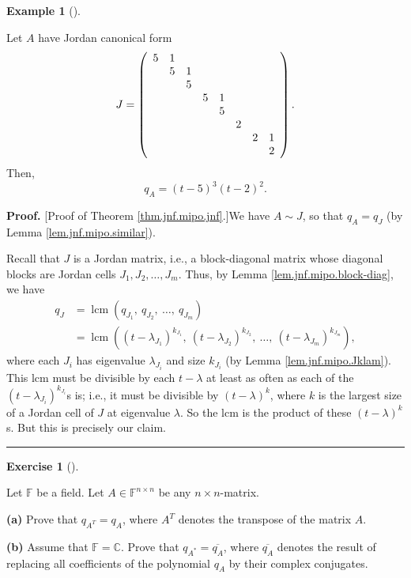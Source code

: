 \documentclass[numbers=enddot,12pt,final,onecolumn,notitlepage]{scrartcl}%
\newcounter{exer}
\numberwithin{exer}{subsection}
\theoremstyle{definition}
\newtheorem{exam}[theo]{Example}
\newenvironment{example}[1][]
{\begin{exam}[#1]\begin{leftbar}}
{\end{leftbar}\end{exam}}
\newtheorem{exmp}[exer]{Exercise}
\newenvironment{exercise}[1][]
{\begin{exmp}[#1]\begin{leftbar}}
{\end{leftbar}\end{exmp}}
\newenvironment{proof}[1][Proof]{\noindent\textbf{#1.} }{\ \rule{0.5em}{0.5em}}
\begin{document}
\begin{example}
Let $A$ have Jordan canonical form%
\[
J=\left(
\begin{array}
[c]{cccccccc}%
5 & 1 &  &  &  &  &  & \\
& 5 & 1 &  &  &  &  & \\
&  & 5 &  &  &  &  & \\
&  &  & 5 & 1 &  &  & \\
&  &  &  & 5 &  &  & \\
&  &  &  &  & 2 &  & \\
&  &  &  &  &  & 2 & 1\\
&  &  &  &  &  &  & 2
\end{array}
\right)  .
\]
Then,%
\[
q_{A}=\left(  t-5\right)  ^{3}\left(  t-2\right)  ^{2}.
\]

\end{example}

\begin{proof}
[Proof of Theorem \ref{thm.jnf.mipo.jnf}.]We have $A\sim J$, so that
$q_{A}=q_{J}$ (by Lemma \ref{lem.jnf.mipo.similar}).

Recall that $J$ is a Jordan matrix, i.e., a block-diagonal matrix whose
diagonal blocks are Jordan cells $J_{1},J_{2},\ldots,J_{m}$. Thus, by Lemma
\ref{lem.jnf.mipo.block-diag}, we have%
\begin{align*}
q_{J}  &  =\operatorname{lcm}\left(  q_{J_{1}},\ q_{J_{2}},\ \ldots
,\ q_{J_{m}}\right) \\
&  =\operatorname{lcm}\left(  \left(  t-\lambda_{J_{1}}\right)  ^{k_{J_{1}}%
},\ \left(  t-\lambda_{J_{2}}\right)  ^{k_{J_{2}}},\ \ldots,\ \left(
t-\lambda_{J_{m}}\right)  ^{k_{J_{m}}}\right)  ,
\end{align*}
where each $J_{i}$ has eigenvalue $\lambda_{J_{i}}$ and size $k_{J_{i}}$ (by
Lemma \ref{lem.jnf.mipo.Jklam}). This lcm must be divisible by each
$t-\lambda$ at least as often as each of the $\left(  t-\lambda_{J_{i}%
}\right)  ^{k_{J_{i}}}$s is; i.e., it must be divisible by $\left(
t-\lambda\right)  ^{k}$, where $k$ is the largest size of a Jordan cell of $J$
at eigenvalue $\lambda$. So the lcm is the product of these $\left(
t-\lambda\right)  ^{k}$s. But this is precisely our claim.
\end{proof}

\begin{exercise}
 Let $\mathbb{F}$ be a field. Let $A\in\mathbb{F}^{n\times n}$ be any
$n\times n$-matrix. \medskip

\textbf{(a)} Prove that $q_{A^{T}}=q_{A}$, where $A^{T}$ denotes the transpose
of the matrix $A$. \medskip

\textbf{(b)} Assume that $\mathbb{F}=\mathbb{C}$. Prove that $q_{A^{\ast}%
}=\overline{q_{A}}$, where $\overline{q_{A}}$ denotes the result of replacing
all coefficients of the polynomial $q_{A}$ by their complex conjugates.
\end{exercise}
\end{document}
